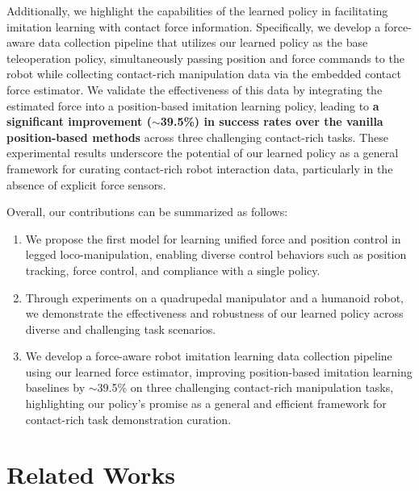 \documentclass{article}
\begin{document}
Additionally, we highlight the capabilities of the learned policy in facilitating imitation learning with contact force information. Specifically, we develop a force-aware data collection pipeline that utilizes our learned policy as the base teleoperation policy, simultaneously passing position and force commands to the robot while collecting contact-rich manipulation data via the embedded contact force estimator. We validate the effectiveness of this data by integrating the estimated force into a position-based imitation learning policy, leading to \textbf{a significant improvement ($\sim$39.5\%) in success rates over the vanilla position-based methods} across three challenging contact-rich tasks. These experimental results underscore the potential of our learned policy as a general framework for curating contact-rich robot interaction data, particularly in the absence of explicit force sensors.

Overall, our contributions can be summarized as follows:

\begin{enumerate}[leftmargin=*,noitemsep,nolistsep]
    \item We propose the first model for learning unified force and position control in legged loco-manipulation, enabling diverse control behaviors such as position tracking, force control, and compliance with a single policy.
    \item Through \numtask experiments on a quadrupedal manipulator and a humanoid robot, we demonstrate the effectiveness and robustness of our learned policy across diverse and challenging task scenarios.
    \item We develop a force-aware robot imitation learning data collection pipeline using our learned force estimator, improving position-based imitation learning baselines by $\sim$39.5\% on three challenging contact-rich manipulation tasks, highlighting our policy's promise as a general and efficient framework for contact-rich task demonstration curation.
\end{enumerate}


\section{Related Works}
\end{document}
